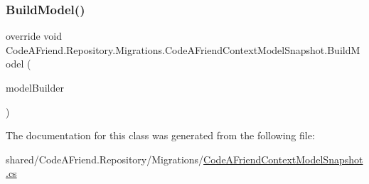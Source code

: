 \subsubsection{\texorpdfstring{Build\+Model()}{BuildModel()}}
{\footnotesize\ttfamily override void Code\+A\+Friend.\+Repository.\+Migrations.\+Code\+A\+Friend\+Context\+Model\+Snapshot.\+Build\+Model (\begin{DoxyParamCaption}\item[{Model\+Builder}]{model\+Builder }\end{DoxyParamCaption})\hspace{0.3cm}{\ttfamily [protected]}}



The documentation for this class was generated from the following file\+:\begin{DoxyCompactItemize}
\item 
shared/\+Code\+A\+Friend.\+Repository/\+Migrations/\mbox{\hyperlink{_code_a_friend_context_model_snapshot_8cs}{Code\+A\+Friend\+Context\+Model\+Snapshot.\+cs}}\end{DoxyCompactItemize}
